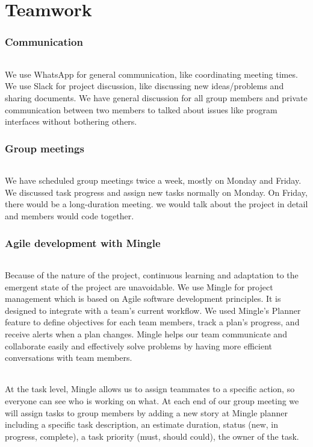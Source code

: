 \documentclass[a4paper,11pt,titlepage]{article}
\begin{document}
\part{Teamwork}
\section{Communication}
\paragraph{}
We use WhatsApp for general communication, like coordinating meeting times. We use Slack for project discussion, like discussing new ideas/problems and sharing documents. We have general discussion for all group members and private communication between two members to talked about issues like program interfaces without bothering others.

\section{Group meetings}
\paragraph{}
We have scheduled group meetings twice a week, mostly on Monday and Friday. We discussed task progress and assign new tasks normally on Monday. On Friday, there would be a long-duration meeting. we would talk about the project in detail and members would code together.
\section{Agile development with Mingle}
\paragraph{}
Because of the nature of the project, continuous learning and adaptation to the emergent state of the project are unavoidable. We use Mingle for project management which is based on Agile software development principles. It is designed to integrate with a team's current workflow. We used Mingle's Planner feature to define objectives for each team members, track a plan's progress, and receive alerts when a plan changes. Mingle helps our team communicate and collaborate easily and effectively solve problems by having more efficient conversations with team members.
\paragraph{}
At the task level, Mingle allows us to assign teammates to a specific action, so everyone can see who is working on what. At each end of our group meeting we will assign tasks to group members by adding a new story at Mingle planner including a specific task description, an estimate duration, status (new, in progress, complete), a task priority (must, should could), the owner of the task. 
\end{document}
